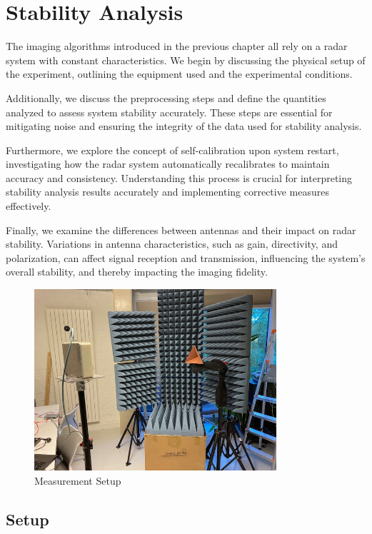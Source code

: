 \newpage
\section{Stability Analysis}
\label{sec:stability_analysis}

The imaging algorithms introduced in the previous chapter all rely on a radar system with constant characteristics.
We begin by discussing the physical setup of the experiment, outlining the equipment used and the experimental conditions.

Additionally, we discuss the preprocessing steps and define the quantities analyzed to assess system stability accurately.
These steps are essential for mitigating noise and ensuring the integrity of the data used for stability analysis.

Furthermore, we explore the concept of self-calibration upon system restart,
investigating how the radar system automatically recalibrates to maintain accuracy and consistency.
Understanding this process is crucial for interpreting stability analysis results accurately and implementing corrective measures effectively.

Finally, we examine the differences between antennas and their impact on radar stability.
Variations in antenna characteristics, such as gain, directivity, and polarization,
can affect signal reception and transmission, influencing the system's overall stability,
and thereby impacting the imaging fidelity.


\begin{figure}[h]
    \centering
    \includegraphics[width=0.8\textwidth]{../figures/aufbau1.jpg}
    \caption{Measurement Setup}
    \label{fig:photo_setup}
\end{figure}

\subsection{Setup}

